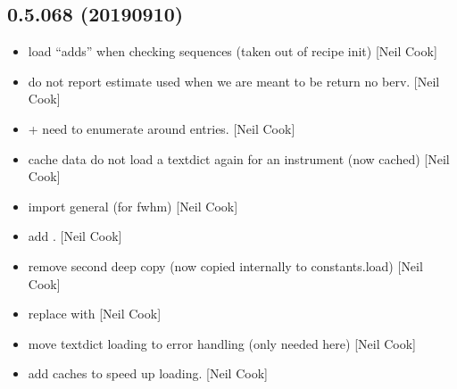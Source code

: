 \documentclass[a4paper,10pt,english]{report}
\begin{document}
\subsection{0.5.068 (2019\sphinxhyphen{}09\sphinxhyphen{}10)}
\label{\detokenize{misc/changelog:id94}}\begin{itemize}
\item {} 
 \sphinxhyphen{} load “adds” when checking
sequences (taken out of recipe init) {[}Neil Cook{]}

\item {} 
 \sphinxhyphen{} do not report estimate used when we are
meant to be return no berv. {[}Neil Cook{]}

\item {} 
 +  \sphinxhyphen{} need to
enumerate around entries. {[}Neil Cook{]}

\item {} 
 \sphinxhyphen{} cache data \sphinxhyphen{} do not load a textdict again
for an instrument (now cached) {[}Neil Cook{]}

\item {} 
 \sphinxhyphen{} import general (for fwhm) {[}Neil Cook{]}

\item {} 
 \sphinxhyphen{} add . {[}Neil
Cook{]}

\item {} 
 \sphinxhyphen{} remove second deep copy (now copied internally to
constants.load) {[}Neil Cook{]}

\item {} 
 \sphinxhyphen{} replace  with 
{[}Neil Cook{]}

\item {} 
 \sphinxhyphen{} move textdict loading to error handling
(only needed here) {[}Neil Cook{]}

\item {} 
 \sphinxhyphen{} add caches to speed up loading.
{[}Neil Cook{]}


\end{itemize}
\end{document}

